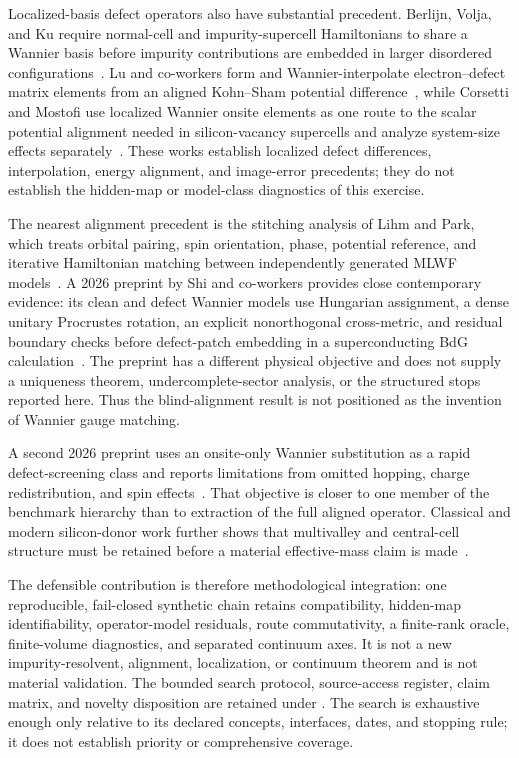 Localized-basis defect operators also have substantial precedent.
Berlijn, Volja, and Ku require normal-cell and impurity-supercell Hamiltonians
to share a Wannier basis before impurity contributions are embedded in larger
disordered configurations~\cite{berlijnVoljaKu2011}. Lu and co-workers form and
Wannier-interpolate electron--defect matrix elements from an aligned
Kohn--Sham potential difference~\cite{luParkZhouBernardi2020}, while
Corsetti and Mostofi use localized Wannier onsite elements as one route to the
scalar potential alignment needed in silicon-vacancy supercells and analyze
system-size effects separately~\cite{corsettiMostofi2011}. These works establish
localized defect differences, interpolation, energy alignment, and image-error
precedents; they do not establish the hidden-map or model-class diagnostics of
this exercise.

The nearest alignment precedent is the stitching analysis of Lihm and Park,
which treats orbital pairing, spin orientation, phase, potential reference, and
iterative Hamiltonian matching between independently generated MLWF
models~\cite{lihmPark2019}. A 2026 preprint by Shi and co-workers provides close
contemporary evidence: its clean and defect Wannier models use Hungarian
assignment, a dense unitary Procrustes rotation, an explicit nonorthogonal
cross-metric, and residual boundary checks before defect-patch embedding in a
superconducting BdG calculation~\cite{shiXieZhangChuGong2026}. The preprint has
a different physical objective and does not supply a uniqueness theorem,
undercomplete-sector analysis, or the structured stops reported here. Thus the
blind-alignment result is not positioned as the invention of Wannier gauge
matching.

A second 2026 preprint uses an onsite-only Wannier substitution as a rapid
defect-screening class and reports limitations from omitted hopping, charge
redistribution, and spin effects~\cite{kangMuechler2026}. That objective is
closer to one member of the benchmark hierarchy than to extraction of the full
aligned operator. Classical and modern silicon-donor work further shows that
multivalley and central-cell structure must be retained before a material
effective-mass claim is made~\cite{kohnLuttinger1955donor,gamble2015}.

The defensible contribution is therefore methodological integration: one
reproducible, fail-closed synthetic chain retains compatibility, hidden-map
identifiability, operator-model residuals, route commutativity, a finite-rank
oracle, finite-volume diagnostics, and separated continuum axes. It is not a
new impurity-resolvent, alignment, localization, or continuum theorem and is
not material validation. The bounded search protocol, source-access register,
claim matrix, and novelty disposition are retained under
. The search is
exhaustive enough only relative to its declared concepts, interfaces, dates,
and stopping rule; it does not establish priority or comprehensive coverage.


